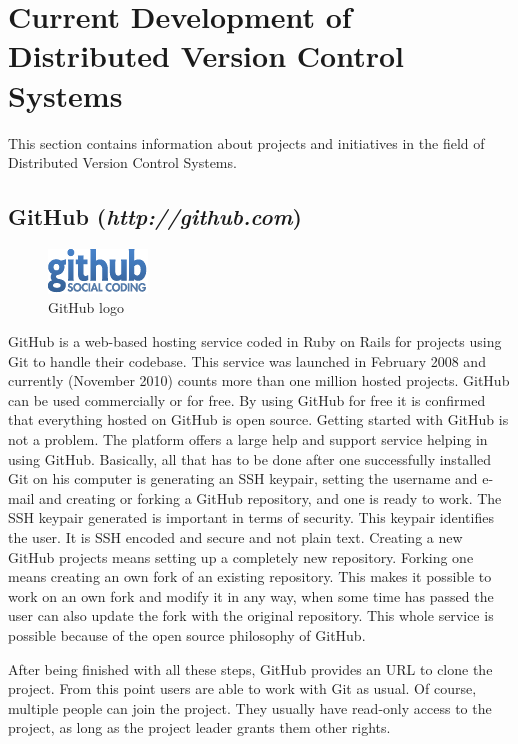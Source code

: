 \section{Current Development of Distributed Version Control Systems}\label{currentdevelopment}

This section contains information about projects and initiatives in the field of Distributed Version Control Systems.

\subsection{GitHub (\textit{http://github.com})}
\begin{figure}[h]
  \centering 
  \includegraphics{img/github}
  \caption{GitHub logo}
  \label{}
\end{figure}
GitHub is a web-based hosting service coded in Ruby on Rails for projects using Git to handle their codebase. This service was launched in February 2008 and currently (November 2010) counts more than one million hosted projects. GitHub can be used commercially or for free. By using GitHub for free it is confirmed that everything hosted on GitHub is open source.
Getting started with GitHub is not a problem. The platform offers a large help and support service helping in using GitHub.
Basically, all that has to be done after one successfully installed Git on his computer is generating an SSH keypair, setting the username and e-mail and creating or forking a GitHub repository, and one is ready to work.
The SSH keypair generated is important in terms of security. This keypair identifies the user. It is SSH encoded and secure and not plain text.
Creating a new GitHub projects means setting up a completely new repository. Forking one means creating an own fork of an existing repository. This makes it possible to work on an own fork and modify it in any way, when some time has passed the user can also update the fork with the original repository. This whole service is possible because of the open source philosophy of GitHub.

After being finished with all these steps, GitHub provides an URL to clone the project. From this point users are able to work with Git as usual. Of course, multiple people can join the project. They usually have read-only access to the project, as long as the project leader grants them other rights.

